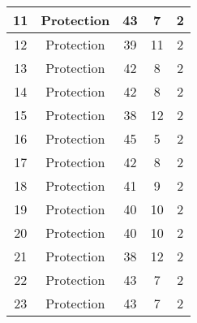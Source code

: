 \documentclass[results.tex]{subfiles}
\begin{document}
\begin{center}
\begin{tabular}{| c || c | c | c | c |}
            \hline
            11                      & Protection                   & 43                     & 7                       & 2                    \\
            \hline
            12                      & Protection                   & 39                     & 11                      & 2                    \\
            \hline
            13                      & Protection                   & 42                     & 8                       & 2                    \\
            \hline
            14                      & Protection                   & 42                     & 8                       & 2                    \\
            \hline
            15                      & Protection                   & 38                     & 12                      & 2                    \\
            \hline
            16                      & Protection                   & 45                     & 5                       & 2                    \\
            \hline
            17                      & Protection                   & 42                     & 8                       & 2                    \\
            \hline
            18                      & Protection                   & 41                     & 9                       & 2                    \\
            \hline
            19                      & Protection                   & 40                     & 10                      & 2                    \\
            \hline
            20                      & Protection                   & 40                     & 10                      & 2                    \\
            \hline
            21                      & Protection                   & 38                     & 12                      & 2                    \\
            \hline
            22                      & Protection                   & 43                     & 7                       & 2                    \\
            \hline
            23                      & Protection                   & 43                     & 7                       & 2                    \\

\end{tabular}
\end{center}
\end{document}
